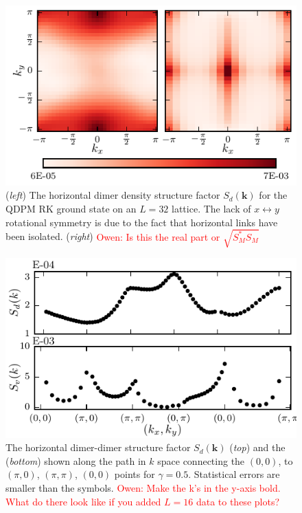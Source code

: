 \documentclass[twocolumn,prb,aps,floatfix,superscriptaddress]{revtex4-1}
\newcommand{\note}[1]{\textcolor{red}{#1}}
\begin{document}
   \begin{figure}[]
        \centering
        \includegraphics[width=1.0\columnwidth]{qdpm_dmr_vis_HM_16x16.pdf}
        \caption{({\it left}) The horizontal dimer density structure factor $S_d(\bm{k})$ for the QDPM RK ground state on an $L=32$ lattice. The lack of $x\leftrightarrow y$ rotational symmetry is due to the fact that horizontal links have been isolated. ({\it right}) \note{Owen: Is this the real part or $\sqrt{S_M^* S_M}$}}
        \label{fig:structure_factor} 
    \end{figure}
    \begin{figure}[]
        \centering
        \includegraphics[width=1.0\columnwidth]{vis_dmr_qdpm_struc_fac_32x32.pdf}
        \caption{ The horizontal dimer-dimer structure factor $S_d(\bm{k})$ ({\it top}) and the ({\it bottom})
        shown along the path in $k$ space connecting the $(0,0)$, to $(\pi,0)$, $(\pi,\pi)$, $(0,0)$
        points for $\gamma=0.5$. Statistical errors are smaller than the symbols. \note{Owen: Make the k's in the y-axis bold. What do there look like if you added $L=16$ data to these plots?}}
        \label{fig:structure_factor_path}
    \end{figure}
\end{document}
